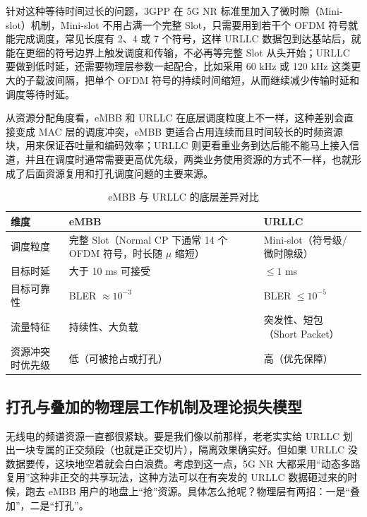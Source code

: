 针对这种等待时间过长的问题，3GPP 在 5G NR 标准里加入了微时隙（Mini-slot）机制，Mini-slot 不用占满一个完整 Slot，只需要用到若干个 OFDM 符号就能完成调度，常见长度有 2、4 或 7 个符号，这样 URLLC 数据包到达基站后，就能在更细的符号边界上触发调度和传输，不必再等完整 Slot 从头开始；URLLC 要做到低时延，还需要物理层参数一起配合，比如采用 60 kHz 或 120 kHz 这类更大的子载波间隔，把单个 OFDM 符号的持续时间缩短，从而继续减少传输时延和调度等待时延。

从资源分配角度看，eMBB 和 URLLC 在底层调度粒度上不一样，这种差别会直接变成 MAC 层的调度冲突，eMBB 更适合占用连续而且时间较长的时频资源块，用来保证吞吐量和编码效率；URLLC 则更看重业务到达后能不能马上接入信道，并且在调度时通常需要更高优先级，两类业务使用资源的方式不一样，也就形成了后面资源复用和打孔调度问题的主要来源。
\begin{table}[htbp]
\centering
\small
\setlength{\tabcolsep}{4pt}
\caption{eMBB 与 URLLC 的底层差异对比}
\label{tab:embb_urllc_comparison}
\renewcommand{\arraystretch}{1.3}
\begin{tabularx}{\textwidth}{@{}>{\raggedright\arraybackslash}p{}>{\raggedright\arraybackslash}p{}>{\raggedright\arraybackslash}X@{}}
\toprule
\textbf{维度} & \textbf{eMBB} & \textbf{URLLC} \\
\midrule
调度粒度 & 完整 Slot（Normal CP 下通常 14 个 OFDM 符号，时长随 $\mu$ 缩短） & Mini-slot（符号级/微时隙级） \\
目标时延 & 大于 10 ms 可接受 & $\le 1$ ms \\
目标可靠性 & BLER $\approx 10^{-3}$ & BLER $\le 10^{-5}$ \\
流量特征 & 持续性、大负载 & 突发性、短包（Short Packet） \\
资源冲突时优先级 & 低（可被抢占或打孔） & 高（优先保障） \\
\bottomrule
\end{tabularx}
\end{table}

\subsection{打孔与叠加的物理层工作机制及理论损失模型}\label{212-ux6253ux5b54打孔ux4e0eux53e0ux52a0superpositionux7684ux7269ux7406ux5c42ux5de5ux4f5cux673aux5236}


无线电的频谱资源一直都很紧缺。要是我们像以前那样，老老实实给 URLLC 划出一块专属的正交频段（也就是正交切片），隔离效果确实好。但如果 URLLC 没数据要传，这块地空着就会白白浪费。考虑到这一点，5G NR 大都采用“动态多路复用”这种非正交的共享玩法，这种方法可以在有突发的 URLLC 数据砸过来的时候，跑去 eMBB 用户的地盘上“抢”资源。具体怎么抢呢？物理层有两招：一是“叠加”，二是“打孔”。

